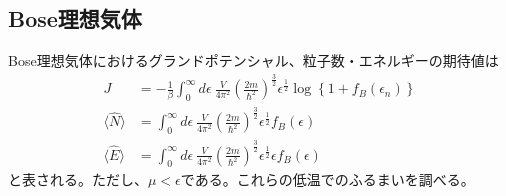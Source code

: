 \documentclass{jsarticle}  %
\numberwithin{equation}{section} %
\numberwithin{figure}{section}
\begin{document}
\subsection{Bose理想気体}
    Bose理想気体におけるグランドポテンシャル、粒子数・エネルギーの期待値は
    \begin{align}
        J &= -\frac{1}{\beta} \int_{0}^{\infty} d\epsilon\ \frac{V}{4 \pi^2} \left( \frac{2m}{\hbar^2} \right)^{\frac{3}{2}} \epsilon^\frac{1}{2} \log \left\{ 1 + f_B (\epsilon_n) \right\} \\
        \langle \hat{N} \rangle &= \int_0^{\infty} d\epsilon\ \frac{V}{4 \pi^2} \left( \frac{2m}{\hbar^2} \right)^{\frac{3}{2}} \epsilon^\frac{1}{2} f_B(\epsilon) \\
        \langle \hat{E} \rangle &= \int_0^{\infty} d\epsilon\  \frac{V}{4 \pi^2} \left( \frac{2m}{\hbar^2} \right)^{\frac{3}{2}} \epsilon^\frac{1}{2} \epsilon f_B(\epsilon)
    \end{align}
    と表される。ただし、$\mu < \epsilon$である。これらの低温でのふるまいを調べる。
\end{document}
